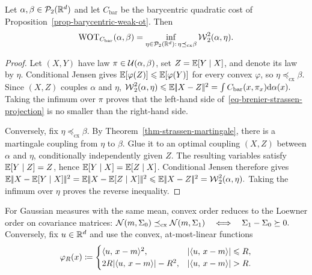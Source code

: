 \begin{prop}\label{prop-brenier-strassen-projection}
Let $\alpha,\beta\in\mathcal{P}_2(\mathbb{R}^d)$ and let $C_{\mathrm{bar}}$ be the barycentric quadratic cost of Proposition~\ref{prop-barycentric-weak-ot}. Then
\begin{equation}\label{eq-brenier-strassen-projection}
\operatorname{WOT}_{C_{\mathrm{bar}}}(\alpha,\beta)
=
\inf_{\eta\in\mathcal{P}_2(\mathbb{R}^d):\,\eta\preceq_{\mathrm{cx}}\beta}
\operatorname{\mathcal{W}}_2^2(\alpha,\eta).
\end{equation}
\end{prop}
\begin{proof}
Let $(X,Y)$ have law $\pi\in\mathcal{U}(\alpha,\beta)$, set $Z=\mathbb{E}[Y\mid X]$, and denote its law by $\eta$. Conditional Jensen gives
\(\mathbb{E}[\varphi(Z)] \leqslant \mathbb{E}[\varphi(Y)]\)
for every convex $\varphi$, so $\eta\preceq_{\mathrm{cx}}\beta$. Since $(X,Z)$ couples $\alpha$ and $\eta$, \(\operatorname{\mathcal{W}}_2^2(\alpha,\eta) \leqslant \mathbb{E}|\!| X-Z |\!|^2 = \int C_{\mathrm{bar}}(x,\pi_x)\mathrm{d}\alpha(x).\)
Taking the infimum over $\pi$ proves that the left-hand side of~\eqref{eq-brenier-strassen-projection} is no smaller than the right-hand side.

Conversely, fix $\eta\preceq_{\mathrm{cx}}\beta$. By Theorem~\ref{thm-strassen-martingale}, there is a martingale coupling from $\eta$ to $\beta$. Glue it to an optimal coupling $(X,Z)$ between $\alpha$ and $\eta$, conditionally independently given $Z$. The resulting variables satisfy $\mathbb{E}[Y\mid Z]=Z$, hence
\(\mathbb{E}[Y\mid X]=\mathbb{E}[Z\mid X]\).
Conditional Jensen therefore gives \(\mathbb{E}|\!| X-\mathbb{E}[Y\mid X] |\!|^2 = \mathbb{E}|\!| X-\mathbb{E}[Z\mid X] |\!|^2 \leqslant \mathbb{E}|\!| X-Z |\!|^2 = \operatorname{\mathcal{W}}_2^2(\alpha,\eta).\)
Taking the infimum over $\eta$ proves the reverse inequality.
\end{proof}
For Gaussian measures with the same mean, convex order reduces to the Loewner order on covariance matrices:
\(\mathcal{N}(m,\Sigma_0)\preceq_{\mathrm{cx}}\mathcal{N}(m,\Sigma_1) \quad\Longleftrightarrow\quad \Sigma_1-\Sigma_0\succeq0.\)
Conversely, fix $u\in\mathbb{R}^d$ and use the convex, at-most-linear functions
\[
\varphi_R(x)
\eqdef
\begin{cases}
\dotp{u}{x-m}^2, & |\dotp{u}{x-m}|\leq R,\\
2R|\dotp{u}{x-m}|-R^2, & |\dotp{u}{x-m}|>R.
\end{cases}
\]
